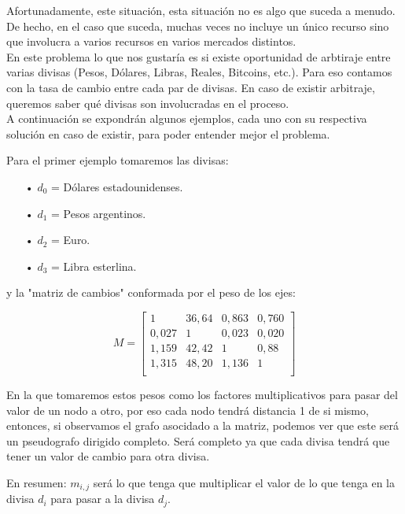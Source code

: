 \documentclass[11pt,a4paper]{article}
\begin{document}
Afortunadamente, este situaci\'on, esta situaci\'on no es algo que suceda a menudo. De hecho, en el caso que suceda, muchas veces no incluye un \'unico recurso sino que involucra a varios recursos en varios mercados distintos.
\\

En este problema lo que nos gustar\'ia es si existe oportunidad de arbtiraje entre varias divisas (Pesos, D\'olares, Libras, Reales, Bitcoins, etc.). Para eso contamos con la tasa de cambio entre cada par de divisas. En caso de existir arbitraje, queremos saber qu\'e divisas son involucradas en el proceso.
\\

A continuaci\'on se expondr\'an algunos ejemplos, cada uno con su respectiva soluci\'on en caso de existir, para poder entender mejor el problema.
\\


Para el primer ejemplo tomaremos las divisas:
\begin{itemize}
    \item[•] $d_{0}$ = D\'olares estadounidenses.
    \item[•] $d_{1}$ = Pesos argentinos.
    \item[•] $d_{2}$ = Euro.
    \item[•] $d_{3}$ = Libra esterlina.
\end{itemize}

y la "matriz de cambios" conformada por el peso de los ejes:

\[
M=
  \begin{bmatrix}
    1 & 36,64 & 0,863 & 0,760 \\
    0,027 & 1 & 0,023 & 0,020 \\
    1,159 & 42,42 & 1 & 0,88 \\
    1,315 & 48,20 & 1,136 & 1 \\
  \end{bmatrix}
\]

En la que tomaremos estos pesos como los factores multiplicativos para pasar del valor de un nodo a otro, por eso cada nodo tendr\'a distancia 1 de si mismo, entonces, si observamos el grafo asocidado a la matriz, podemos ver que este ser\'a un pseudografo dirigido completo. Ser\'a completo ya que cada divisa tendr\'a que tener un valor de cambio para otra divisa.

En resumen: $m_{i,j}$ ser\'a lo que tenga que multiplicar el valor de lo que tenga en la divisa $d_{i}$ para pasar a la divisa $d_{j}$.
\end{document}
